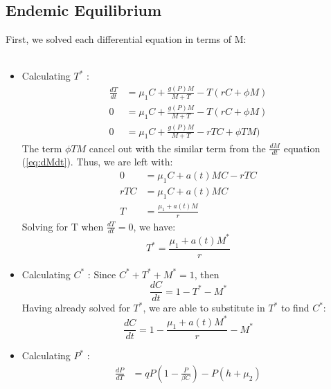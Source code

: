 \documentclass[12pt]{article}
\begin{document}
    \subsection{Endemic Equilibrium}
        \label{appendix:A2}
        First, we solved each differential equation in terms of M: \\ \\
        \begin{itemize}
            \item Calculating $T^{*}$ :
                \begin{align*}
                    \frac{dT}{dt} &= \mu_{1}C + \frac{g(P)M}{M+T} - T(rC+\phi M) \\
                    0 &= \mu_{1}C + \frac{g(P)M}{M+T} - T(rC+\phi M) \\
                    0 &= \mu_{1}C + \frac{g(P)M}{M+T} - rTC+\phi TM) 
                \end{align*}
                The term $\phi TM$ cancel out with the similar term from the $\frac{dM}{dt}$ equation (\ref{eq:dMdt}). Thus, we are left with:
                \begin{align*}
                    0 &= \mu_{1}C + a(t)MC - rTC \\
                    rTC &= \mu_{1}C + a(t)MC \\
                    T &= \frac{\mu_{1} + a(t)M}{r}
                \end{align*}
                Solving for T when $\frac{dT}{dt} = 0$, we have:
                \begin{equation*}
                    T^{*} = \frac{\mu_{1} + a(t)M^{*}}{r}
                \end{equation*}
            \item Calculating $C^{*}$ :
                Since $C^{*}+T^{*}+M^{*} = 1$, then
                \begin{equation*}
                    \frac{dC}{dt} = 1 - T^{*} - M^{*} 
                \end{equation*}
                Having already solved for $T^{*}$, we are able to substitute in $T^{*}$ to find $C^{*}$:
                \begin{equation*}
                    \frac{dC}{dt} = 1 - \frac{\mu_{1} + a(t)M^{*}}{r} - M^{*} 
                \end{equation*}
            \item Calculating $P^{*}$ :
                \begin{align*}
                    \frac{dP}{dT} &= qP\left(1-\frac{P}{\beta C}\right) - P(h + \mu_{2})\\

\end{align*}
\end{itemize}
\end{document}
